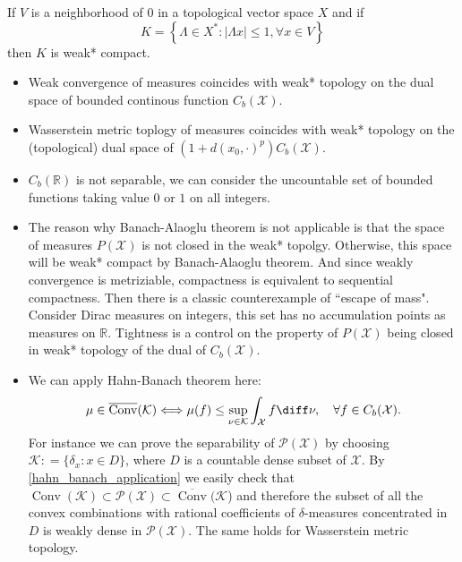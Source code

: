 \begin{thm}
	If \( V \) is a neighborhood of 0 in a topological vector space \( X \) and if
	\[ K = \left\{ \Lambda \in X ^ { * }: | \Lambda x | \leq 1, \forall x \in V \right\} \]
	then $K$ is weak* compact.
\end{thm}

\begin{rmk}
	\begin{itemize}
		\item Weak convergence of measures coincides with weak* topology on the dual space of bounded continous function $C_b(\mathcal{X})$.
		\item Wasserstein metric toplogy of measures coincides with weak* topology on the (topological) dual space of $(1 + d(x_0, \cdot)^p) C_b(\mathcal{X})$.
		\item $C_b(\mathbb{R})$ is not separable, we can consider the uncountable set of bounded functions taking value $0$ or $1$ on all integers.
		\item The reason why Banach-Alaoglu theorem is not applicable is that the space of measures $P(\mathcal{X})$ is not closed in the weak* topolgy. Otherwise, this space will be weak* compact by Banach-Alaoglu theorem. And since weakly convergence is metriziable, compactness is equivalent to sequential compactness. Then there is a classic counterexample of ``escape of mass". Consider Dirac measures on integers, this set has no accumulation points as measures on $\mathbb{R}$. Tightness is a control on the property of $P(\mathcal{X})$ being closed in weak* topology of the dual of $C_b(\mathcal{X})$.
		\item We can apply Hahn-Banach theorem here:
		      \begin{equation}
			      \label{hahn_banach_application}
			      \mu \in \overline { \operatorname { Conv } } ( \mathcal { K } ) \Longleftrightarrow \mu(f) \leq \sup _ { \nu \in \mathcal { K } } \int _ { \mathcal{X} } f \diff \nu, \quad \forall f \in C _ { b }( \mathcal{X} ).
		      \end{equation}
		      For instance we can prove the separability of \( \mathscr { P } ( \mathcal{X} ) \) by choosing \( \mathcal { K }: = \{ \delta _ { x }: x \in D \} \), where \( D \) is a countable dense subset of \( \mathcal{X}\). By \cref{hahn_banach_application} we easily check that \( \operatorname { Conv } (\mathcal { K }) \subset \mathscr { P } ( \mathcal{X} ) \subset \overline { \operatorname { Conv } } (\mathcal { K } \)) and therefore the subset of all the convex combinations with rational coefficients of \( \delta \)-measures concentrated in \( D \) is weakly dense in \( \mathscr { P } ( \mathcal{X} ) \). The same holds for Wasserstein metric topology.


\end{itemize}
\end{rmk}
